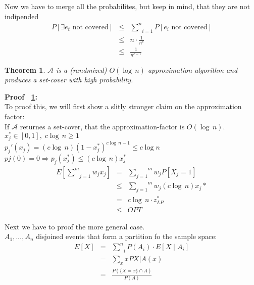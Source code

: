 \documentclass[ngerman,a4paper,11pt]{article}
\newtheorem{lemma}{\bfseries Theorem}
\begin{document}
Now we have to merge all the probabilites, but keep in mind, that they are not indipended
$$\begin{array}{rcl}
   P[\exists e_t\text{ not covered}] &\leq& \underset{i=1}{\overset{n}{\sum}} P[e_i \text{ not covered}]  \\
    &\leq& n\cdot \frac{1}{n^c}\\
    &\leq& \frac{1}{n^{c-1}}
\end{array}$$

\begin{lemma}\label{randround:apx}\mdseries\itshape
$\mathcal{A}$ is a (randmized) $O(\log \, n)$-approximation algorithm
and produces a set-cover with high probability.
\end{lemma}

\begin{description}
   \item{\bfseries Proof ~\ref{randround:apx}:}\\
      To proof this, we will first show a slitly stronger claim on the approximation factor:\\
      If $\mathcal{A}$ returnes a set-cover, that the approximation-factor is $O(\log \, n)$.\\

      $x_j^* \in [0,1], \; c\log \, n \geq 1$\\
      $p_j'(x_j) = (c \log \, n)(1-x_j^*)^{c\log \, n -1} \leq c \log n$\\
      $pj(0)=0 \Rightarrow p_j(x_j^*) \leq (c \log \, n)x_j^*$\\

      $$\begin{array}{rcl}
         E[\underset{j=1}{\overset{m}{\sum}} w_jx_j] &=& \overset{m}{\underset{j=1}{\sum}} w_j P[X_j=1]\\
         &\leq& \overset{m}{\underset{j=1}{\sum}} w_j (c \log \, n)x_j*\\
         &=& c \log \, n \cdot z_{LP}^*\\
         &\leq& OPT
      \end{array}$$
   
      Next we have to proof the more general case.\\

      $A_1, ..., A_n$ disjoined events that form a partition fo the sample space:\\
      $$\begin{array}{rcl}
         E[X] &=& \underset{i}{\overset{n}{\sum}} P(A_i) \cdot E[X \; | \; A_i]\\
         &=& \underset{x}{\sum} x P{X|A} (x)\\
         &=& \frac{P(\{X=x\} \cap A)}{P(A)}
      \end{array}$$


\end{description}
\end{document}
